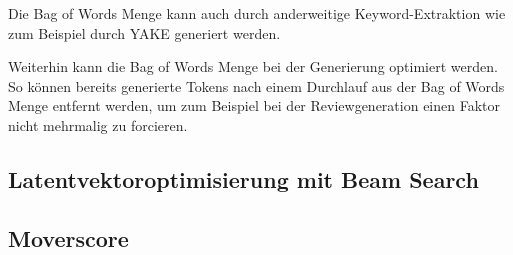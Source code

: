 Die Bag of Words Menge kann auch durch anderweitige Keyword-Extraktion wie zum Beispiel durch YAKE \citep{CAMPOS2020257} generiert werden.


Weiterhin kann die Bag of Words Menge bei der Generierung optimiert werden. 
So können bereits generierte Tokens nach einem Durchlauf aus der Bag of Words Menge entfernt werden, um zum Beispiel bei der Reviewgeneration einen Faktor nicht mehrmalig zu forcieren.


\subsection{Latentvektoroptimisierung mit Beam Search}


\subsection{Moverscore}
\label{moverscore}

\pagebreak
